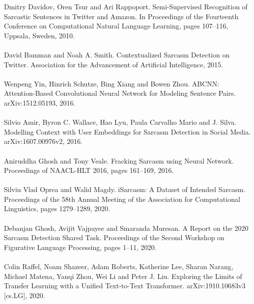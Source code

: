 \documentclass[11pt,a4paper]{article}
\begin{document}
Dmitry Davidov, Oren Tsur and Ari Rappoport. Semi-Supervised Recognition of Sarcastic Sentences
in Twitter and Amazon. In Proceedings of the Fourteenth Conference on Computational Natural Language Learning, pages 107–116, Uppsala, Sweden, 2010.
\\
\\
David Bamman and Noah A. Smith. Contextualized Sarcasm Detection on Twitter. Association for the Advancement of Artificial Intelligence, 2015.
\\
\\
Wenpeng Yin, Hinrich Schutze, Bing Xiang and Bowen Zhou. ABCNN: Attention-Based Convolutional Neural Network for Modeling Sentence Pairs. arXiv:1512.05193, 2016.
\\
\\
Silvio Amir, Byron C. Wallace, Hao Lyu, Paula Carvalho Mario and J. Silva. Modelling Context with User Embeddings for Sarcasm Detection in Social Media. arXiv:1607.00976v2, 2016.
\\
\\
Aniruddha Ghosh and Tony Veale. Fracking Sarcasm using Neural Network. Proceedings of NAACL-HLT 2016, pages 161–169, 2016.
\\
\\
Silviu Vlad Oprea and Walid Magdy. iSarcasm: A Dataset of Intended Sarcasm. Proceedings of the 58th Annual Meeting of the Association for Computational Linguistics, pages 1279–1289, 2020.
\\
\\
Debanjan Ghosh, Avijit Vajpayee and Smaranda Muresan. A Report on the 2020 Sarcasm Detection Shared Task. Proceedings of the Second Workshop on Figurative Language Processing, pages 1–11, 2020.
\\
\\
Colin Raffel, Noam Shazeer, Adam Roberts, Katherine Lee, Sharan Narang, Michael Matena, Yanqi Zhou, Wei Li and Peter J. Liu. Exploring the Limits of Transfer Learning with a Unified Text-to-Text Transformer. arXiv:1910.10683v3 [cs.LG], 2020.
\end{document}
